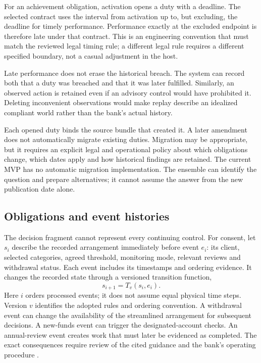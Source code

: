 
For an achievement obligation, activation opens a duty with a deadline. The
selected contract uses the interval from activation up to, but excluding, the
deadline for timely performance. Performance exactly at the excluded endpoint is
therefore late under that contract. This is an engineering convention that must
match the reviewed legal timing rule; a different legal rule requires a different
specified boundary, not a casual adjustment in the host.

Late performance does not erase the historical breach. The system can record both
that a duty was breached and that it was later fulfilled. Similarly, an observed
action is retained even if an advisory control would have prohibited it. Deleting
inconvenient observations would make replay describe an idealized compliant world
rather than the bank's actual history.

Each opened duty binds the source bundle that created it. A later amendment does
not automatically migrate existing duties. Migration may be appropriate, but it
requires an explicit legal and operational policy about which obligations change,
which dates apply and how historical findings are retained. The current MVP has
no automatic migration implementation. The ensemble can identify the question
and prepare alternatives; it cannot assume the answer from the new publication
date alone.

\subsection{Obligations and event histories}
\label{merge:P-03-product:04}


The decision fragment cannot represent every continuing control. For consent,
let $s_i$ describe the recorded arrangement immediately before event $e_i$:
its client, selected categories, agreed threshold, monitoring mode, relevant
reviews and withdrawal status. Each event includes its timestamps and ordering
evidence. It changes the recorded state through a
versioned transition function,
\begin{equation}
 s_{i+1}=T_v(s_i,e_i).
 \label{eq:transition}
\end{equation}
Here $i$ orders processed events; it does not assume equal physical time
steps. Version $v$ identifies the adopted rules and ordering convention. A
withdrawal event can change the availability of the streamlined arrangement for
subsequent decisions. A new-funds event can trigger the designated-account
checks. An annual-review event creates work that must later be evidenced as
completed. The exact consequences require review of the cited guidance and the
bank's operating procedure \citep{sfcspiannex1,sfcspiannex2}.

